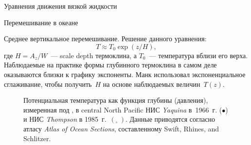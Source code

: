 \begin{chapter}{Уравнения движения вязкой жидкости}
\begin{section}{Перемешивание в океане}
\begin{paragraph}{Среднее вертикальное перемешивание.}
Решение данного уравнения:
\begin{equation}
 T \approx T_0 \exp (z/H),
\end{equation}
где $H=A_z/W$~--- scale depth термоклина, 
а $T_0$~--- температура вблизи его верха. Наблюдаемые на практике формы
глубинного термоклина в самом деле оказываются близки к графику экспоненты. 
Манк использовал экспоненциальное сглаживание, чтобы получить~$H$ на основе 
наблюдаемых величин~$T(z)$.
%

\begin{figure}[t!]
\caption{Потенциальная температура как функция глубины (давления),
измеренная под ,  в central
North Pacific НИС \emph{Yaquina} в~1966~г. ($\bullet$) и НИС
\emph{Thompson} в 1985~г.\ $\left( _\square \;\right)$. 
Данные приводятся согласно атласу \emph{Atlas of Ocean Sections}, 
составленному Swift, Rhines, and Schlitzer.}
\label{fig:mixing}
\end{figure}
%


\end{paragraph}
\end{section}
\end{chapter}
